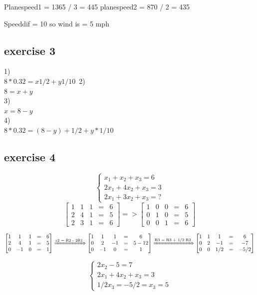 \documentclass[a4paper,10pt,titlepage]{report}
\begin{document}
Planespeed1 = 1365 / 3 = 445
planespeed2 = 870 / 2 = 435

Speeddif = 10 so wind is = 5 mph

\subsection{exercise 3}

1)\\
$8* 0.32 = x 1/2 + y 1/10 $\
2)\\
$8 = x+y$\\
3)\\
$x = 8 - y$\\
4)\\
$8*0.32 = (8-y)+1/2+y*1/10 $\\


\subsection{exercise 4}
\begin{equation}
  \begin{cases}
    x_1 + x_2 + x_3 = 6\\
    2x_1 + 4x_2 + x_3 = 3 \\
    2x_1 + 3x_2 + x_3 = ?
  \end{cases}
\end{equation}
\begin{equation}
\begin{bmatrix}
  1 & 1 & 1 & = & 6 \\
  2 & 4 & 1 & = & 5 \\
  2 & 3 & 1 & = & 6 
\end{bmatrix} => 
\begin{bmatrix}
  1 & 0 & 0 & = & 6 \\
  0 & 1 & 0 & = & 5 \\
  0 & 0 & 1 & = & 6 
\end{bmatrix}
\end{equation}


\begin{equation}
\begin{bmatrix}
  1 & 1 & 1 & = & 6 \\
  2 & 4 & 1 & = & 5 \\
  0 & -1 & 0 & = & 1 
\end{bmatrix} 
\xRightarrow[\text{}]{\text{r2 = R2 - 2R1}}
\begin{bmatrix}
  1 & 1 & 1 & = & 6 \\
  0 & 2 & -1 & = & 5-12 \\
  0 & -1 & 0 & = & 1 
\end{bmatrix} 
\xRightarrow[\text{}]{\text{R3 = R3 + 1/2 R2}}
\begin{bmatrix}
  1 & 1 & 1 & = & 6 \\
  0 & 2 & -1 & = & -7 \\
  0 & 0 & 1/2 & = & -5/2 
\end{bmatrix}
\end{equation}

\begin{equation}
  \begin{cases}
    2x_2 -5 = 7\\
    2x_1 + 4x_2 + x_3 = 3 \\
    1/2 x_3 = -5/2 = x_3 = 5
  \end{cases}
\end{equation}
\end{document}
